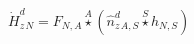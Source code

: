 \documentclass[border=2pt]{standalone}
\begin{document}
${{\dot{H}^d_z}}{_{N}}={{F}}{_{N, A}} \stackrel{A}{\star} \left({{\hat{n}^{d}_z}}{_{A, S}} \stackrel{S}{\star} {h}{_{N, S}}\right)$
\end{document}
